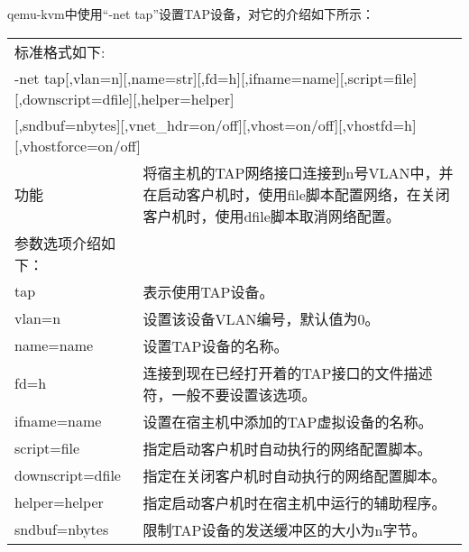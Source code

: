 \documentclass[a4paper,left=2.5cm,right=2.5cm,11pt]{article}
\newcommand{\interval}{\vspace{0.5em}}
\begin{document}
	qemu-kvm中使用“-net tap”设置TAP设备，对它的介绍如下所示：
	\interval
	\begin{longtable}{p{3.5cm}p{10cm}}
	\hline
	标准格式如下: & \\
	\multicolumn{2}{l}{-net tap[,vlan=n][,name=str][,fd=h][,ifname=name][,script=file][,downscript=dfile][,helper=helper]}\\
	\multicolumn{2}{l}{[,sndbuf=nbytes][,vnet\_hdr=on/off][,vhost=on/off][,vhostfd=h][,vhostforce=on/off]} \\
	\hline
	功能 & 将宿主机的TAP网络接口连接到n号VLAN中，并在启动客户机时，使用file脚本配置网络，在关闭客户机时，使用dfile脚本取消网络配置。\\
	\hline
	参数选项介绍如下： & \\
	\hline
	tap & 表示使用TAP设备。 \\
	\hline
	vlan=n & 设置该设备VLAN编号，默认值为0。\\
	\hline
	name=name & 设置TAP设备的名称。\\
	\hline
	fd=h & 连接到现在已经打开着的TAP接口的文件描述符，一般不要设置该选项。\\
	\hline
	ifname=name & 设置在宿主机中添加的TAP虚拟设备的名称。\\
	\hline
	script=file & 指定启动客户机时自动执行的网络配置脚本。\\
	\hline
	downscript=dfile & 指定在关闭客户机时自动执行的网络配置脚本。\\
	\hline
	helper=helper & 指定启动客户机时在宿主机中运行的辅助程序。\\
	\hline
	sndbuf=nbytes & 限制TAP设备的发送缓冲区的大小为n字节。 \\
	\hline
	\end{longtable}
\end{document}
